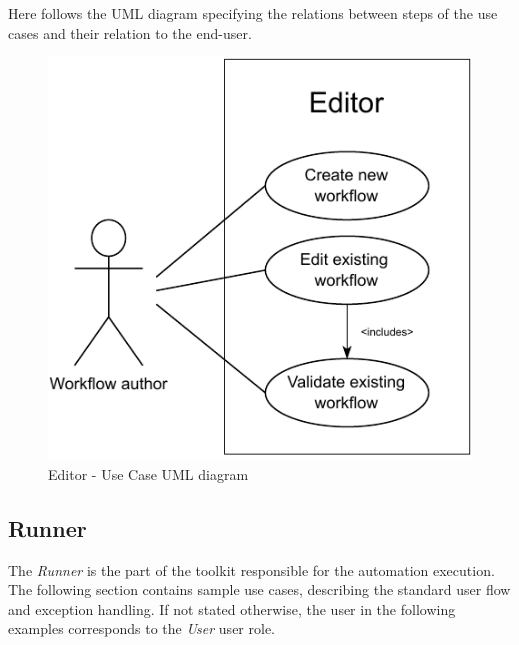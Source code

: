 Here follows the UML diagram specifying the relations between steps of the use cases and their relation to the end-user.

\begin{center}
\begin{figure}[h]
    \begin{center}
        \includegraphics{./img/editorUC.pdf}
    \end{center}
    \caption{Editor - Use Case UML diagram}
\end{figure}
\end{center}

\clearpage
\subsection{Runner}

The \textit{Runner} is the part of the toolkit responsible for the automation execution.
The following section contains sample use cases, describing the standard user flow and exception handling.
If not stated otherwise, the user in the following examples corresponds to the \textit{User} user role. \

\setcounter{usecases}{1}

\def \usecase {Use Case \numb{usecases}}

